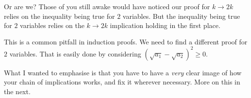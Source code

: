 Or are we? Those of you still awake would have noticed our proof for $k \rightarrow 2k$ relies on the inequality being true for $2$ variables. But the inequality being true for $2$ variables relies on the $k \rightarrow 2k$ implication holding in the first place.

This is a common pitfall in induction proofs. We need to find a different proof for $2$ variables. That is easily done by considering $(\sqrt {a_1} - \sqrt{a_2})^2 \geq 0$.

What I wanted to emphasise is that you have to have a \textit{very} clear image of how your chain of implications works, and fix it wherever necessary. More on this in the next.
